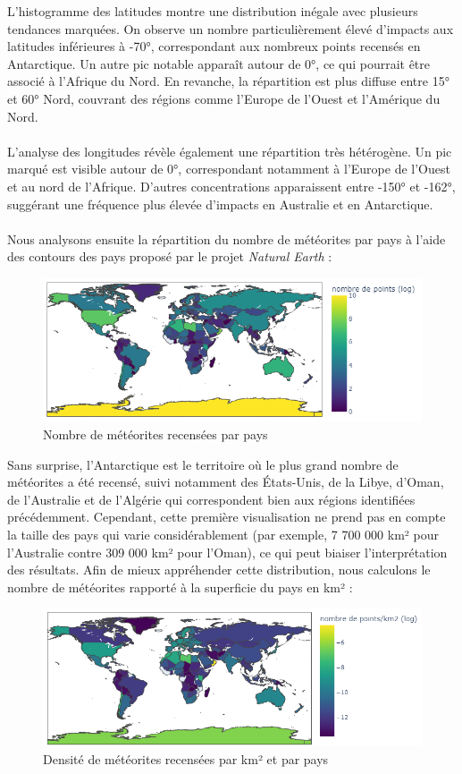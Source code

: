 \documentclass[12pt]{article}
\begin{document}
L'histogramme des latitudes montre une distribution inégale avec plusieurs tendances marquées. On observe un nombre particulièrement élevé d'impacts aux latitudes inférieures à -70°, correspondant aux nombreux points recensés en Antarctique. Un autre pic notable apparaît autour de 0°, ce qui pourrait être associé à l'Afrique du Nord. En revanche, la répartition est plus diffuse entre 15° et 60° Nord, couvrant des régions comme l'Europe de l'Ouest et l'Amérique du Nord.\\
\\
L'analyse des longitudes révèle également une répartition très hétérogène. Un pic marqué est visible autour de 0°, correspondant notamment à l'Europe de l'Ouest et au nord de l'Afrique. D'autres concentrations apparaissent entre -150° et -162°, suggérant une fréquence plus élevée d'impacts en Australie et en Antarctique.\\
\\
Nous analysons ensuite la répartition du nombre de météorites par pays à l'aide des contours des pays proposé par le projet \textit{Natural Earth} \cite{Natural_Earth} :
\begin{figure}[H]
 \centering 
\includegraphics[width=17cm]{Images/exploration/map_points_countries_avec_echelle.png}
 \caption{Nombre de météorites recensées par pays}
 \end{figure}
Sans surprise, l’Antarctique est le territoire où le plus grand nombre de météorites a été recensé, suivi notamment des États-Unis, de la Libye, d’Oman, de l’Australie et de l’Algérie qui correspondent bien aux régions identifiées précédemment. Cependant, cette première visualisation ne prend pas en compte la taille des pays qui varie considérablement (par exemple, 7 700 000 km² pour l’Australie contre 309 000 km² pour l'Oman), ce qui peut biaiser l’interprétation des résultats. Afin de mieux appréhender cette distribution, nous calculons le nombre de météorites rapporté à la superficie du pays en km² :
\begin{figure}[H] 
\centering
 \includegraphics[width=17cm]{Images/exploration/map_points_km2_avec_echelle.png}
 \caption{Densité de météorites recensées par km² et par pays}
 \end{figure}
\end{document}
